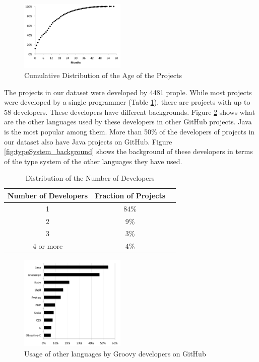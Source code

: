 \documentclass[preprint]{sigplanconf}
\begin{document}
\begin{figure}[ht]
\centering \includegraphics[width=0.45\textwidth]{images/age_distribution}
\caption{Cumulative Distribution of the Age of the Projects}
\label{fig:age_distribution} 
\end{figure}

The projects in our dataset were developed by 4481 prople. 
While most projects were developed by a single programmer (Table \ref{tab:number_of_developers}), there are projects with up to 58 developers.
These developers have different backgrounds.
Figure \ref{fig:other_languages} shows what are the other languages used by these developers in other GitHub projects. 
Java is the most popular among them.
More than 50\% of the developers of projects in our dataset also have Java projects on GitHub.
Figure \ref{fig:typeSystem_background} shows the background of these developers in terms of the type system of the other languages they have used.
 
\begin{table}[ht]
\caption{Distribution of the Number of Developers}
\centering{}%
\begin{tabular}{|c|c|c|}
\hline 
Number of Developers & Fraction of Projects\tabularnewline
\hline 
\hline 
1 & 84\%\tabularnewline
\hline 
2 & 9\%\tabularnewline
\hline 
3 & 3\%\tabularnewline
\hline 
4 or more & 4\%\tabularnewline
\hline 
\end{tabular}
\label{tab:number_of_developers}
\end{table}

\begin{figure}[ht]
\centering \includegraphics[width=0.45\textwidth]{images/other_languages}
\caption{Usage of other languages by Groovy developers on GitHub}
\label{fig:other_languages} 
\end{figure}
\end{document}
